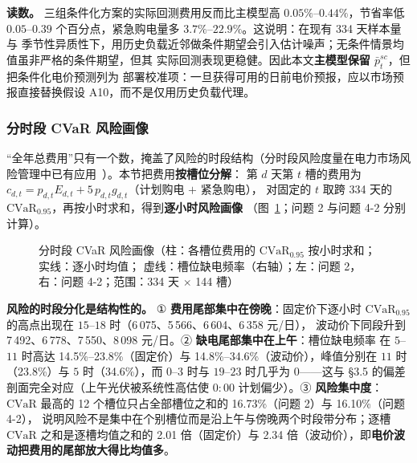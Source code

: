 \textbf{读数。} 三组条件化方案的实际回测费用反而比主模型高 \(0.05\%\)--\(0.44\%\)，节省率低
\(0.05\)--\(0.39\) 个百分点，紧急购电量多 \(3.7\%\)--\(22.9\%\)。这说明：在现有 334 天样本量与
季节性异质性下，用历史负载近邻做条件期望会引入估计噪声；无条件情景均值虽非严格的条件期望，但其
实际回测表现更稳健。因此本文\textbf{主模型保留 \(\bar p^{sc}_t\)}，但把条件化电价预测列为
部署校准项：一旦获得可用的日前电价预报，应以市场预报直接替换假设 A10，而不是仅用历史负载代理。




\subsubsection{分时段 CVaR 风险画像}
\label{sec:q4-risk}

“全年总费用”只有一个数，掩盖了风险的时段结构（分时段风险度量在电力市场风险管理中已有应用~\cite{refwangtaiqiang}）。本节把费用\textbf{按槽位分解}：
第 $d$ 天第 $t$ 槽的费用为 $c_{d,t}=p_{d,t}E_{d,t}+5\,p_{d,t}g_{d,t}$（计划购电 $+$ 紧急购电），
对固定的 $t$ 取跨 334 天的 $\mathrm{CVaR}_{0.95}$，再按小时求和，得到\textbf{逐小时风险画像}
（图~\ref{fig:risk-profile}；问题 2 与问题 4-2 分别计算）。

\begin{figure}[htbp]
  \centering
  \caption{分时段 CVaR 风险画像（柱：各槽位费用的 \(\mathrm{CVaR}_{0.95}\) 按小时求和；实线：逐小时均值；
            虚线：槽位缺电频率（右轴）；左：问题 2，右：问题 4-2；范围：334 天 \(\times\) 144 槽）}
  \label{fig:risk-profile}
\end{figure}

\textbf{风险的时段分化是结构性的。} ① \textbf{费用尾部集中在傍晚}：固定价下逐小时
\(\mathrm{CVaR}_{0.95}\) 的高点出现在 \(15\)--\(18\) 时（6\,075、5\,566、6\,604、6\,358 元/日），
波动价下同段升到 7\,492、6\,778、7\,550、8\,098 元/日。② \textbf{缺电尾部集中在上午}：槽位缺电频率
在 \(5\)--\(11\) 时高达 14.5\%--23.8\%（固定价）与 14.8\%--34.6\%（波动价），峰值分别在 \(11\)
时（23.8\%）与 \(5\) 时（34.6\%），而 \(0\)--\(3\) 时与 \(19\)--\(23\) 时几乎为 0——这与
\S3.5 的偏差剖面完全对应（上午光伏被系统性高估使 \(0{:}00\) 计划偏少）。③ \textbf{风险集中度}：
\(\mathrm{CVaR}\) 最高的 12 个槽位只占全部槽位之和的 16.73\%（问题 2）与 16.10\%（问题 4-2），
说明风险不是集中在个别槽位而是沿上午与傍晚两个时段带分布；逐槽 \(\mathrm{CVaR}\) 之和是逐槽均值之和的
2.01 倍（固定价）与 2.34 倍（波动价），即\textbf{电价波动把费用的尾部放大得比均值多}。

